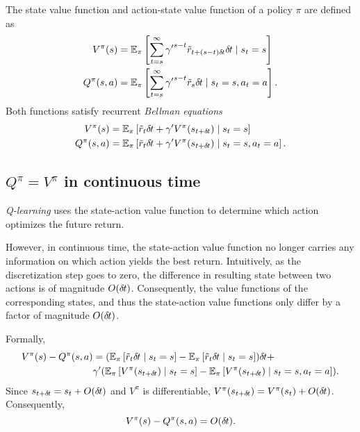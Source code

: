 The state value function and action-state value function of a policy
$\pi$ are defined as
\begin{align}
	V^\pi(s) &= \mathbb{E}_\pi\left[
		\sum\limits_{t=s}^\infty
		{\gamma'}^{s - t} \tilde{r}_{t + (s-t)\delta\hspace*{-.3mm}t} \delta\hspace*{-.3mm}t
		\mid
		s_t = s
	\right]\\
	Q^\pi(s, a) &= \mathbb{E}_\pi\left[
		\sum\limits_{t=s}^\infty
		{\gamma'}^{s - t} \tilde{r}_s \delta\hspace*{-.3mm}t
		\mid
		s_t = s, a_t = a
	\right].
\end{align}
Both functions satisfy recurrent \emph{Bellman equations}
\begin{align}
	V^\pi(s) &= \mathbb{E}_\pi\left[
		\tilde{r}_t \delta\hspace*{-.3mm}t + \gamma' V^\pi(s_{t + \delta\hspace*{-.3mm}t})
		\mid
	s_t = s\right]\\
	Q^\pi(s, a) &= \mathbb{E}_\pi\left[
		\tilde{r}_t \delta\hspace*{-.3mm}t + \gamma' V^\pi(s_{t + \delta\hspace*{-.3mm}t})
		\mid
	s_t = s, a_t = a\right].
\end{align}

\subsection{$Q^\pi = V^\pi$ in continuous time}
\emph{Q-learning} uses the state-action value function to determine which
action optimizes the future return.

However, in continuous time, the state-action value function no longer carries
any information on which action yields the best return. Intuitively, as the
discretization step goes to zero, the difference in resulting state between two
actions is of magnitude $O (\delta\hspace*{-.3mm}t)$. Consequently, the value functions of
the corresponding states, and thus the state-action value functions only differ
by a factor of magnitude $O (\delta\hspace*{-.3mm}t)$.

Formally,
\begin{align}
	V^\pi(s) - Q^\pi(s, a) &= 
	(\mathbb{E}_\pi\left[\tilde{r}_t \delta\hspace*{-.3mm}t \mid s_t=s\right] -
	\mathbb{E}_\pi\left[\tilde{r}_t \delta\hspace*{-.3mm}t \mid s_t=s\right]) \delta\hspace*{-.3mm}t +\\
	&\gamma'(\mathbb{E}_\pi\left[
		V^\pi(s_{t + \delta\hspace*{-.3mm}t})
		\mid s_t = s
	\right] - \mathbb{E}_\pi\left[
		V^\pi(s_{t + \delta\hspace*{-.3mm}t})
		\mid s_t = s, a_t=a
	\right]).\nonumber
\end{align}
Since $s_{t+\delta\hspace*{-.3mm}t} = s_t + O (\delta\hspace*{-.3mm}t)$ and $V^\pi$ is differentiable,
$V^\pi(s_{t+\delta\hspace*{-.3mm}t}) = V^\pi(s_t) + O (\delta\hspace*{-.3mm}t)$. Consequently,
\begin{equation}
	V^\pi(s) - Q^\pi(s, a) = O (\delta\hspace*{-.3mm}t).
\end{equation}
